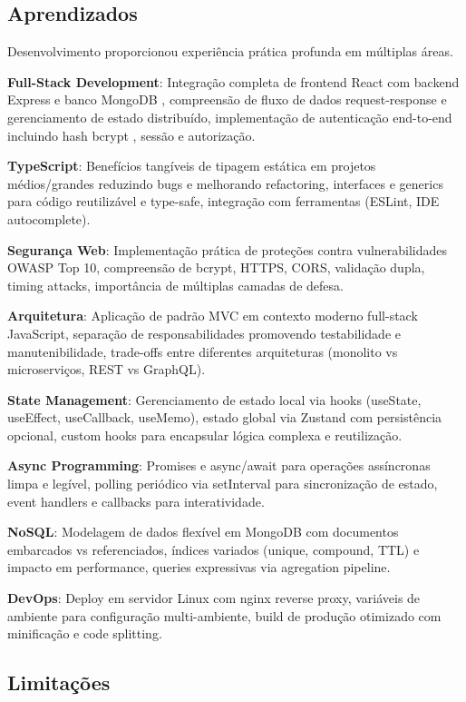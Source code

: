 \documentclass[conference]{IEEEtran}
\begin{document}
\subsection{Aprendizados}

Desenvolvimento proporcionou experiência prática profunda em múltiplas áreas.

\textbf{Full-Stack Development}: Integração completa de frontend React \cite{react:2024} com backend Express \cite{express:2024} e banco MongoDB \cite{mongodb:2024}, compreensão de fluxo de dados request-response e gerenciamento de estado distribuído, implementação de autenticação end-to-end incluindo hash bcrypt \cite{bcrypt:2024}, sessão e autorização.

\textbf{TypeScript}: Benefícios tangíveis de tipagem estática em projetos médios/grandes reduzindo bugs e melhorando refactoring, interfaces e generics para código reutilizável e type-safe, integração com ferramentas (ESLint, IDE autocomplete).

\textbf{Segurança Web}: Implementação prática de proteções contra vulnerabilidades OWASP Top 10, compreensão de bcrypt, HTTPS, CORS, validação dupla, timing attacks, importância de múltiplas camadas de defesa.

\textbf{Arquitetura}: Aplicação de padrão MVC em contexto moderno full-stack JavaScript, separação de responsabilidades promovendo testabilidade e manutenibilidade, trade-offs entre diferentes arquiteturas (monolito vs microserviços, REST vs GraphQL).

\textbf{State Management}: Gerenciamento de estado local via hooks (useState, useEffect, useCallback, useMemo), estado global via Zustand com persistência opcional, custom hooks para encapsular lógica complexa e reutilização.

\textbf{Async Programming}: Promises e async/await para operações assíncronas limpa e legível, polling periódico via setInterval para sincronização de estado, event handlers e callbacks para interatividade.

\textbf{NoSQL}: Modelagem de dados flexível em MongoDB com documentos embarcados vs referenciados, índices variados (unique, compound, TTL) e impacto em performance, queries expressivas via agregation pipeline.

\textbf{DevOps}: Deploy em servidor Linux com nginx reverse proxy, variáveis de ambiente para configuração multi-ambiente, build de produção otimizado com minificação e code splitting.

\subsection{Limitações}
\end{document}
